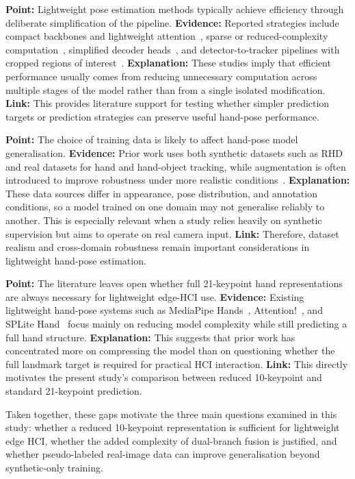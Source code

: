 \documentclass[10pt,letterpaper]{article}
\begin{document}
\medskip
\noindent\textbf{Point:} Lightweight pose estimation methods typically achieve efficiency through deliberate simplification of the pipeline.  
\textbf{Evidence:} Reported strategies include compact backbones and lightweight attention~\cite{attentionlite}, sparse or reduced-complexity computation~\cite{splitehand}, simplified decoder heads~\cite{efficientpose}, and detector-to-tracker pipelines with cropped regions of interest~\cite{mediapipe}.  
\textbf{Explanation:} These studies imply that efficient performance usually comes from reducing unnecessary computation across multiple stages of the model rather than from a single isolated modification.  
\textbf{Link:} This provides literature support for testing whether simpler prediction targets or prediction strategies can preserve useful hand-pose performance.

\medskip
\noindent\textbf{Point:} The choice of training data is likely to affect hand-pose model generalisation.  
\textbf{Evidence:} Prior work uses both synthetic datasets such as RHD and real datasets for hand and hand-object tracking, while augmentation is often introduced to improve robustness under more realistic conditions~\cite{handobjectgcn,lightweightgcnhand,handaugment}.  
\textbf{Explanation:} These data sources differ in appearance, pose distribution, and annotation conditions, so a model trained on one domain may not generalise reliably to another. This is especially relevant when a study relies heavily on synthetic supervision but aims to operate on real camera input.  
\textbf{Link:} Therefore, dataset realism and cross-domain robustness remain important considerations in lightweight hand-pose estimation.

\medskip
\noindent\textbf{Point:} The literature leaves open whether full 21-keypoint hand representations are always necessary for lightweight edge-HCI use.  
\textbf{Evidence:} Existing lightweight hand-pose systems such as MediaPipe Hands~\cite{mediapipe}, Attention!~\cite{attentionlite}, and SPLite Hand~\cite{splitehand} focus mainly on reducing model complexity while still predicting a full hand structure.  
\textbf{Explanation:} This suggests that prior work has concentrated more on compressing the model than on questioning whether the full landmark target is required for practical HCI interaction.  
\textbf{Link:} This directly motivates the present study's comparison between reduced 10-keypoint and standard 21-keypoint prediction.

\medskip
Taken together, these gaps motivate the three main questions examined in this study: whether a reduced 10-keypoint representation is sufficient for lightweight edge HCI, whether the added complexity of dual-branch fusion is justified, and whether pseudo-labeled real-image data can improve generalisation beyond synthetic-only training.
\end{document}
